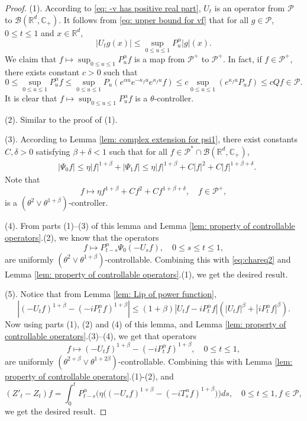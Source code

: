 \documentclass[12pt,a4paper]{amsart}
\theoremstyle{plain}
\theoremstyle{definition}
\numberwithin{equation}{section}
\begin{document}
\begin{proof}
    (1). According to \eqref{eq: -v has positive real part}, $U_t$ is an operator from $\mathcal P$ to $\mathcal B(\mathbb R^d, \mathbb C_+)$.
    It follows from \eqref{eq: upper bound for vf} that for all $g\in \mathcal P$, $0\leq t\leq 1$ and $x\in \mathbb R^d$,
\[
    |U_t g(x)|
    \leq \sup_{0\leq u\leq 1}P_u^\alpha |g| (x).
\]
  We claim that $f\mapsto\sup_{0\leq u\leq 1}P^{\alpha}_u f$ is a map from $\mathcal P^+$ to $\mathcal P^+$. In fact, if $f\in \mathcal P^+$, there exists constant $c>0$ such that
\[
	0
	\leq \sup_{0\leq u\leq 1}P^{\alpha}_u f
	\leq \sup_{0\leq u\leq 1} P_u (e^{\alpha u} e^{-\kappa_f u} e^{\kappa_f u} f )
	\leq c \sup_{0\leq u\leq 1} (e^{\kappa_fu}P_u f) \leq c Qf \in \mathcal P.
\]
	It is clear that $f\mapsto\sup_{0\leq u\leq 1}P^{\alpha}_u f$ is a $\theta$-controller.


    (2). Similar to the proof of (1).

    (3).
        According to Lemma \ref{lem: complex extension for psi1},
         there exist constants $C, \delta >0$ 
         satisfying $\beta+\delta< 1$ such that for all
         $f\in \mathcal P^* \cap \mathcal B(\mathbb R^d, \mathbb C_+)$,
\begin{align}
    &|\Psi_0 f|
    \leq \eta |f|^{1+\beta} + |\Psi_1 f|
    \leq \eta |f|^{1+\beta} + C|f|^2+ C |f|^{1+\beta + \delta}.
\end{align}
    Note that
\[
    f \mapsto \eta f^{1+\beta} + Cf^2+ Cf^{1+\beta + \delta},\quad f\in \mathcal P^+,
\]
    is a $(\theta^2 \vee \theta^{1+\beta})$-controller.

    (4). From parts (1)--(3) of this lemma and Lemma \ref{lem: property of controllable operators}.(2), we know that the operators
\[
    f\mapsto P^\alpha_{t-s}\Psi_0(-U_sf),
    \quad 0\leq s\leq t\leq 1,
\]
    are uniformly $(\theta^2\vee \theta^{1+\beta})$-controllable.
    Combining this with \eqref{eq:chareq2} and Lemma \ref{lem: property of controllable operators}.(1), we get the desired result.

    (5). Notice that from Lemma \ref{lem: Lip of power function},
\[
    |(-U_t f)^{1+\beta} - (-iP^\alpha_t f)^{1+\beta} |
    \leq  (1+\beta) |U_t f-iP^\alpha_t f|(|U_t f|^{\beta}+|i P^\alpha_t f|^{\beta}).
\]
    Now using parts (1), (2) and  (4) of this lemma, and Lemma \ref{lem: property of controllable operators}.(3)--(4), we get that operators
\[
    f \mapsto (-U_t f)^{1+\beta} - (-iP^\alpha_t f)^{1+\beta},\quad 0\leq t\leq 1,
\]
    are uniformly $(\theta^{2+\beta}\vee \theta^{1+2\beta})$-controllable.
    Combining this with Lemma \ref{lem: property of controllable operators}.(1)-(2), and
\begin{equation}
    (Z'_t - Z_t)f = \int_0^t P^\alpha_{t-s}\Big( \eta \big((-U_s f)^{1+\beta} - (-iT_s^\alpha f)^{1+\beta} \big)\Big)ds,
    \quad 0\leq t\leq 1, f\in \mathcal P,
\end{equation}
    we get the desired result.


\end{proof}
\end{document}
